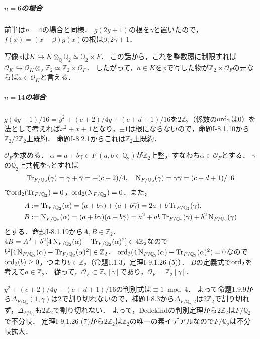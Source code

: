 \subparagraph{$n = 6$の場合}
前半は$n = 4$の場合と同様．
$g(2y+1)$の根を$\gamma$と置いたので，$f(x)=(x-\beta)g(x)$の根は$\beta, 2\gamma+1$．

写像$\phi$は$K\hookrightarrow K\otimes_\mathbb{Q}\mathbb{Q}_2\simeq\mathbb{Q}_2\times F$．
この話から，これを整数環に制限すれば$\mathcal{O}_K\hookrightarrow\mathcal{O}_K\otimes_\mathbb{Z}\mathbb{Z}_2\simeq\mathbb{Z}_2\times\mathcal{O}_F$．
したがって，$a\in K$を$\phi$で写した物が$\mathbb{Z}_2\times\mathcal{O}_F$の元ならば$a\in\mathcal{O}_K$と言える．

\subparagraph{$n = 14$の場合}
$g(4y+1)/16 = y^2+(c+2)/4y+(c+d+1)/16$を$2\mathbb{Z}_2$（係数の$\operatorname{ord}_2$は$0$）を法として考えれば$x^2+x+1$となり，$\pm1$は根にならないので，命題I-8.1.10から$\mathbb{Z}_2/2\mathbb{Z}_2$上既約．
命題I-8.2.1からこれは$\mathbb{Z}_2$上既約．

$\mathcal{O}_F$を求める．
$\alpha=a+b\gamma\in F~ (a, b\in\mathbb{Q}_2)$が$\mathbb{Z}_2$上整，すなわち$\alpha \in \mathcal{O}_F$とする．
$\gamma$の$\mathbb{Q}_2$上共軛を$\overline{\gamma}$とすれば
\[\operatorname{Tr}_{F/\mathbb{Q}_2}(\gamma)=\gamma+\overline{\gamma}=-(c+2)/4, \quad\operatorname{N}_{F/\mathbb{Q}_2}(\gamma)=\gamma\overline{\gamma}=(c+d+1)/16\]
で$\operatorname{ord}_2(\operatorname{Tr}_{F/\mathbb{Q}_2})=0$，$\operatorname{ord}_2(\operatorname{N}_{F/\mathbb{Q}_2})=0$．また，
\begin{align*}
  A &:= \operatorname{Tr}_{F/\mathbb{Q}_2}(\alpha) = (a+b\gamma) + (a+b\overline{\gamma}) = 2a + b\operatorname{Tr}_{F/\mathbb{Q}_2}(\gamma), \\
  B &:= \operatorname{N}_{F/\mathbb{Q}_2}(\alpha) = (a+b\gamma)(a+b\overline{\gamma}) = a^2 + ab\operatorname{Tr}_{F/\mathbb{Q}_2}(\gamma) + b^2\operatorname{N}_{F/\mathbb{Q}_2}(\gamma)
\end{align*}
とする．命題I-8.1.19から$A, B\in\mathbb{Z}_2$．
$4B=A^2+b^2[4\operatorname{N}_{F/\mathbb{Q}_2}(\alpha)-\operatorname{Tr}_{F/\mathbb{Q}_2}(\alpha)^2]\in4\mathbb{Z}_2$なので$b^2[4\operatorname{N}_{F/\mathbb{Q}_2}(\alpha)-\operatorname{Tr}_{F/\mathbb{Q}_2}(\alpha)^2]\in\mathbb{Z}_2$．
$\operatorname{ord}_2(4\operatorname{N}_{F/\mathbb{Q}_2}(\alpha)-\operatorname{Tr}_{F/\mathbb{Q}_2}(\alpha)^2)=0$なので$\operatorname{ord}_2(b)\geq0$，つまり$b\in\mathbb{Z}_2$（命題1.1.3，定理I-9.1.26 (5)）．
$B$の定義式で$\operatorname{ord}_2$を考えて$a\in\mathbb{Z}_2$．
従って，$\mathcal{O}_F \subset \mathbb{Z}_2[\gamma]$であり，$\mathcal{O}_F = \mathbb{Z}_2[\gamma]$．

$y^2+(c+2)/4y+(c+d+1)/16$の判別式は$\equiv1\bmod4$．
よって命題1.9.9から$\varDelta_{F/\mathbb{Q}_2}(1, \gamma)$は$2$で割り切れないので，補題1.8.3から$\varDelta_{F/\mathbb{Q}_2, 2}$は$2\mathbb{Z}_2$で割り切れず，$\varDelta_{F/\mathbb{Q}_2}$も$2\mathbb{Z}_2$で割り切れない．
よって，Dedekindの判別定理から$2\mathbb{Z}_2$は$F/\mathbb{Q}_2$で不分岐．
定理I-9.1.26 (7)から$2\mathbb{Z}_2$は$\mathbb{Z}_2$の唯一の素イデアルなので$F/\mathbb{Q}_2$は不分岐拡大．

